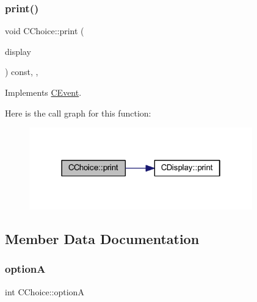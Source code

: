 \subsubsection{\texorpdfstring{print()}{print()}}
{\footnotesize\ttfamily void C\+Choice\+::print (\begin{DoxyParamCaption}\item[{const \mbox{\hyperlink{class_c_display}{C\+Display}} \&}]{display }\end{DoxyParamCaption}) const\hspace{0.3cm}{\ttfamily [inline]}, {\ttfamily [override]}, {\ttfamily [virtual]}}



Implements \mbox{\hyperlink{class_c_event_ad6f75aa0babcd74caff9426cecdd86f0}{C\+Event}}.

Here is the call graph for this function\+:\nopagebreak
\begin{figure}[H]
\begin{center}
\leavevmode
\includegraphics[width=274pt]{class_c_choice_a5280ff7c539ed8c8a4007ac38822d9b9_cgraph}
\end{center}
\end{figure}


\subsection{Member Data Documentation}
\mbox{\label{class_c_choice_abca7c10fc012acfb1145ae7524050bc5}} 
\subsubsection{\texorpdfstring{optionA}{optionA}}
{\footnotesize\ttfamily int C\+Choice\+::optionA\hspace{0.3cm}{\ttfamily [protected]}}

\mbox{\label{class_c_choice_a6343fc4edf568af23978d9df5f4b94b5}} 
